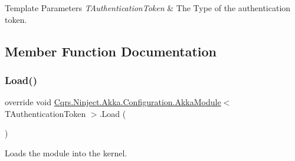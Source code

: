 \begin{DoxyTemplParams}{Template Parameters}
{\em T\+Authentication\+Token} & The Type of the authentication token.\\
\hline
\end{DoxyTemplParams}


\subsection{Member Function Documentation}
\mbox{\label{classCqrs_1_1Ninject_1_1Akka_1_1Configuration_1_1AkkaModule_ac20ff271987cecce0c8e0d8507adefc0_ac20ff271987cecce0c8e0d8507adefc0}} 
\subsubsection{\texorpdfstring{Load()}{Load()}}
{\footnotesize\ttfamily override void \hyperlink{classCqrs_1_1Ninject_1_1Akka_1_1Configuration_1_1AkkaModule}{Cqrs.\+Ninject.\+Akka.\+Configuration.\+Akka\+Module}$<$ T\+Authentication\+Token $>$.Load (\begin{DoxyParamCaption}{ }\end{DoxyParamCaption})}



Loads the module into the kernel. 

